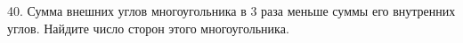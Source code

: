 40. Сумма внешних углов многоугольника в 3 раза меньше суммы его внутренних углов. Найдите число сторон этого многоугольника.\\

